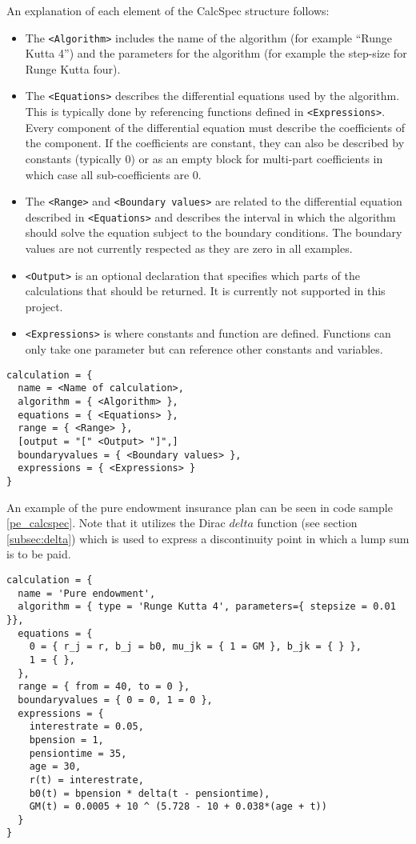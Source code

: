 An explanation of each element of the CalcSpec structure follows:
\begin{itemize}
\item The \lstinline$<Algorithm>$ includes the name of the algorithm (for example ``Runge Kutta 4'') and the parameters for the algorithm (for example the step-size for Runge Kutta four).
\item The \lstinline$<Equations>$ describes the differential equations used by the algorithm. This is typically done by referencing functions defined in \lstinline$<Expressions>$. Every component of the differential equation must describe the coefficients of the component. If the coefficients are constant, they can also be described by constants (typically 0) or as an empty block for multi-part coefficients in which case all sub-coefficients are 0.
\item The \lstinline$<Range>$ and \lstinline$<Boundary values>$ are related to the differential equation described in \lstinline$<Equations>$ and describes the interval in which the algorithm should solve the equation subject to the boundary conditions. The boundary values are not currently respected as they are zero in all examples.
\item \lstinline$<Output>$ is an optional declaration that specifies which parts of the calculations that should be returned. It is currently not supported in this project. %
\item \lstinline$<Expressions>$ is where constants and function are defined. Functions can only take one parameter but can reference other constants and variables.
\end{itemize}

\begin{lstlisting}[caption=CalcSpec structure, label=calcspecstructure, language=calcspec]
calculation = {
  name = <Name of calculation>,
  algorithm = { <Algorithm> },
  equations = { <Equations> },
  range = { <Range> },
  [output = "[" <Output> "]",]
  boundaryvalues = { <Boundary values> },
  expressions = { <Expressions> }
}
\end{lstlisting}

An example of the pure endowment insurance plan can be seen in code sample \ref{pe_calcspec}. 
Note that it utilizes the Dirac $delta$ function\cite{hassani2009dirac} (see section \ref{subsec:delta}) which is used to express a discontinuity point in which a lump sum is to be paid.


\begin{lstlisting}[caption=The pure endowment insurance plan expressed in CalcSpec, label=pe_calcspec, language=calcspec]
calculation = {
  name = 'Pure endowment',
  algorithm = { type = 'Runge Kutta 4', parameters={ stepsize = 0.01 }},
  equations = { 
    0 = { r_j = r, b_j = b0, mu_jk = { 1 = GM }, b_jk = { } },
    1 = { },
  },
  range = { from = 40, to = 0 },
  boundaryvalues = { 0 = 0, 1 = 0 },
  expressions = {
    interestrate = 0.05,
    bpension = 1,
    pensiontime = 35,
    age = 30,
    r(t) = interestrate,
    b0(t) = bpension * delta(t - pensiontime),
    GM(t) = 0.0005 + 10 ^ (5.728 - 10 + 0.038*(age + t))
  }
}
\end{lstlisting}

